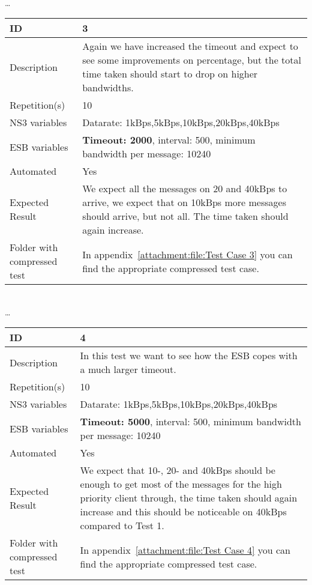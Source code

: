 \begin{center}
\\ \ldots \\

\begin{tabular}{| p{4cm} | p{8cm} |}%
	\hline
	ID & 3 \\
	\hline
	Description & Again we have increased the timeout and expect to see some improvements on percentage, but the total time taken should start to drop on higher bandwidths.  \\
	\hline
	Repetition(s) & 10 \\
	\hline
	NS3 variables & Datarate: 1kBps,5kBps,10kBps,20kBps,40kBps \\
	\hline
	ESB variables & \textbf{Timeout: 2000}, interval: 500, minimum bandwidth per message: 10240 \\
	\hline
	Automated & Yes \\
	\hline
	Expected Result & We expect all the messages on 20 and 40kBps to arrive, we expect that on 10kBps more messages should arrive, but not all. The time taken should again increase. \\
	\hline
	Folder with compressed test & In appendix~\ref{attachment:file:Test Case 3} you can find the appropriate compressed test case.\\
	\hline
\end{tabular}

\\ \ldots \\

\begin{tabular}{| p{4cm} | p{8cm} |}%
	\hline
	ID & 4 \\
	\hline
	Description & In this test we want to see how the ESB copes with a much larger timeout.  \\
	\hline
	Repetition(s) & 10 \\
	\hline
	NS3 variables & Datarate: 1kBps,5kBps,10kBps,20kBps,40kBps \\
	\hline
	ESB variables & \textbf{Timeout: 5000}, interval: 500, minimum bandwidth per message: 10240 \\
	\hline
	Automated & Yes \\
	\hline
	Expected Result & We expect that 10-, 20- and 40kBps should be enough to get most of the messages for the high priority client through, the time taken should again increase and this should be noticeable on 40kBps compared to Test 1.  \\
	\hline
	Folder with compressed test & In appendix~\ref{attachment:file:Test Case 4} you can find the appropriate compressed test case.\\
	\hline
\end{tabular}


\end{center}
